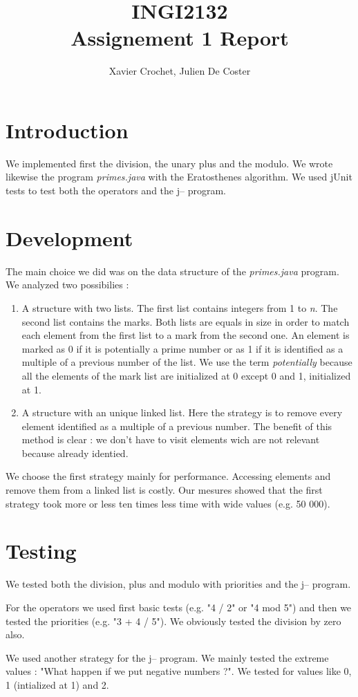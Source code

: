 \documentclass[10pt,a4paper]{article}
\author{Xavier Crochet, Julien De Coster}
\title{INGI2132 \\ Assignement 1 Report}
\begin{document}
\maketitle

\section{Introduction}

We implemented first the division, the unary plus and the modulo. We wrote likewise the program \emph{primes.java} with the Eratosthenes algorithm. We used jUnit tests to test both the operators and the j-- program.

\section{Development}

The main choice we did was on the data structure of the \emph{primes.java} program. We analyzed two possibilies :

\begin{enumerate}
\item A structure with two lists. The first list contains integers from 1 to \emph{n}. The second list contains the marks. Both lists are equals in size in order to match each element from the first list to a mark from the second one. An element is marked as 0 if it is potentially a prime number or as 1 if it is identified as a multiple of a previous number of the list. We use the term \emph{potentially} because all the elements of the mark list are initialized at 0 except 0 and 1, initialized at 1.

\item A structure with an unique linked list. Here the strategy is to remove every element identified as a multiple of a previous number. The benefit of this method is clear : we don't have to visit elements wich are not relevant because already identied.
\end{enumerate}

We choose the first strategy mainly for performance. Accessing elements and remove them from a linked list is costly. Our mesures showed that the first strategy took more or less ten times less time with wide values (e.g. 50 000).

\section{Testing}

We tested both the division, plus and modulo with priorities and the j-- program.

For the operators we used first basic tests (e.g. "4 / 2" or "4 mod 5") and then we tested the priorities (e.g. "3 + 4 / 5"). We obviously tested the division by zero also.

We used another strategy for the j-- program. We mainly tested the extreme values : "What happen if we put negative numbers ?". We tested for values like 0, 1 (intialized at 1) and 2.
\end{document}

